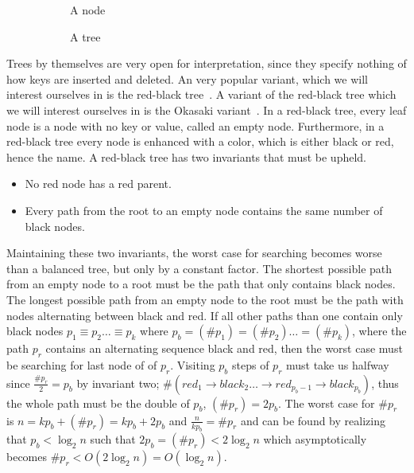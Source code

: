 \begin{figure}
  \begin{subfigure}[b]{0.49\textwidth}
    \centering
    \caption{A node}
    \label{fig:anode}
  \end{subfigure}
  \begin{subfigure}[b]{0.49\textwidth}
    \centering
    \caption{A tree}
    \label{fig:atree}
  \end{subfigure}
  \caption{}
  \label{fig:nodeandtree}
\end{figure}

Trees by themselves are very open for interpretation, since they specify nothing of how keys are inserted and deleted.
An very popular variant, which we will interest ourselves in is the red-black tree~\cite{bayer1972symmetric}.
A variant of the red-black tree which we will interest ourselves in is the Okasaki variant~\cite{okasaki1999red}.
In a red-black tree, every leaf node is a node with no key or value, called an empty node.
Furthermore, in a red-black tree every node is enhanced with a color, which is either black or red, hence the name.
A red-black tree has two invariants that must be upheld.
\begin{itemize}
  \item No red node has a red parent.
  \item Every path from the root to an empty node contains the same number of black nodes.
\end{itemize}
Maintaining these two invariants, the worst case for searching becomes worse than a balanced tree, but only by a constant factor.
The shortest possible path from an empty node to a root must be the path that only contains black nodes.
The longest possible path from an empty node to the root must be the path with nodes alternating between black and red.
If all other paths than one contain only black nodes $p_1 \equiv p_2 \dots \equiv p_k$ where $p_b = (\#p_1) = (\#p_2) \dots = (\#p_k)$, where the path $p_r$ contains an alternating sequence black and red, then the worst case must be searching for last node of of $p_r$.
Visiting $p_b$ steps of $p_r$ must take us halfway since $\frac{\#p_r}{2} = p_b$ by invariant two; $\#(\textit{red}_1 \rightarrow \textit{black}_2 \dots \rightarrow \textit{red}_{p_b - 1} \rightarrow \textit{black}_{p_b})$, thus the whole path must be the double of $p_b$, $(\#p_r) = 2p_b$.
The worst case for $\#p_r$ is $n = k p_b + (\#p_r) = k p_b + 2 p_b$ and $\frac{n}{k p_b} = \#p_r$ and can be found by realizing that $p_b < \log_2 n$ such that $2p_b = (\#p_r) < 2\log_2 n$ which asymptotically becomes $\#p_r < O(2\log_2 n) = O(\log_2 n)$.

